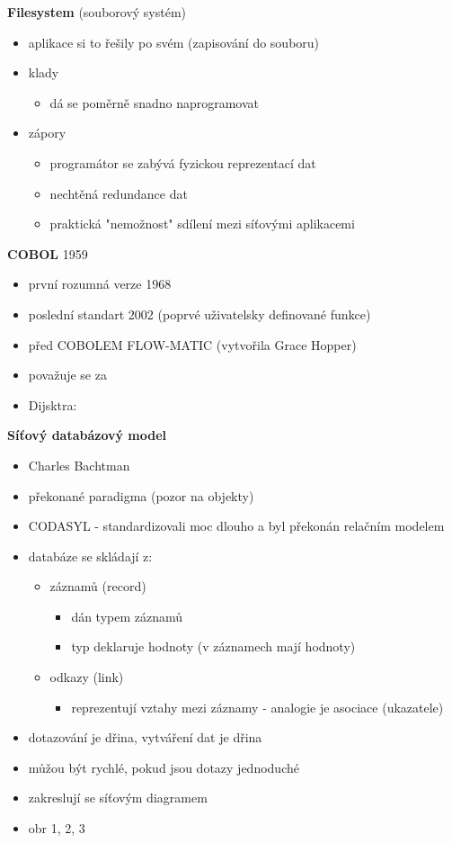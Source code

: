 \documentclass[10pt, a4paper, titlepage]{article}
\theoremstyle{note}
\begin{document}
\textbf{Filesystem} (souborový systém)
\begin{itemize}
	\item aplikace si to řešily po svém (zapisování do souboru)
	\item klady
	\begin{itemize}
		\item dá se poměrně snadno naprogramovat
	\end{itemize}		 
	\item zápory
	\begin{itemize}
		\item programátor se zabývá fyzickou reprezentací dat
		\item nechtěná redundance dat
		\item praktická "nemožnost" sdílení mezi síťovými aplikacemi
	\end{itemize}
\end{itemize}

\textbf{COBOL} 1959
\begin{itemize}
	\item první rozumná verze 1968
	\item poslední standart 2002 (poprvé uživatelsky definované funkce)
	\item před COBOLEM FLOW-MATIC (vytvořila Grace Hopper)
	\item považuje se za 
	\item Dijsktra: 
\end{itemize}

\textbf{Síťový databázový model}
\begin{itemize}
	\item Charles Bachtman
	\item překonané paradigma (pozor na objekty)
	\item CODASYL - standardizovali moc dlouho a byl překonán relačním modelem
	\item databáze se skládají z:
	\begin{itemize}
		\item záznamů (record)
		\begin{itemize}
			\item dán typem záznamů
			\item typ deklaruje hodnoty (v záznamech mají hodnoty)
		\end{itemize}
		\item odkazy (link)
		\begin{itemize}
			\item reprezentují vztahy mezi záznamy - analogie je asociace (ukazatele)
		\end{itemize}
	\end{itemize}
	\item dotazování je dřina, vytváření dat je dřina
	\item můžou být rychlé, pokud jsou dotazy jednoduché
	\item zakreslují se síťovým diagramem
	\item  obr 1, 2, 3
\end{itemize}
\end{document}
